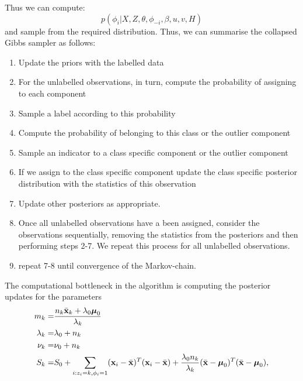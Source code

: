 \documentclass[12pt,english]{article}\usepackage[]{graphicx}\usepackage[]{color}
\begin{document}
Thus we can compute:
\begin{equation}
p(\phi_i|X,Z,\theta, \phi_{-i}, \beta, u,v, H)
\end{equation}
and sample from the required distribution. Thus, we can summarise the collapsed Gibbs sampler as follows:
\begin{enumerate}
\item Update the priors with the labelled data\\
\item For the unlabelled observations, in turn, compute the probability of assigning to each component\\
\item Sample a label according to this probability \\
\item Compute the probability of belonging to this class or the outlier component \\
\item Sample an indicator to a class specific component or the outlier component \\
\item If we assign to the class specific component update the class specific posterior distribution with the statistics of this observation \\
\item Update other posteriors as appropriate.
\item Once all unlabelled observations have a been assigned, consider the observations sequentially, removing the statistics from the posteriors and then performing steps 2-7. We repeat this process for all unlabelled observations.
\item repeat 7-8 until convergence of the Markov-chain.
\end{enumerate}
The computational bottleneck in the algorithm is computing the posterior updates for the parameters
\begin{equation}
\begin{split}
m_k = & \frac{n_k\bar{{\bf x}}_k + \lambda_0 \boldsymbol{\mu}_0}{\lambda_k}\\
\lambda_k = & \lambda_0 + n_k\\
\nu_k = & \nu_0 + n_k \\
S_k = & S_0 + \sum_{i:z_i = k, \phi_i = 1}({\bf x}_i - \bar{{\bf x}})^{T}({\bf x}_i - \bar{{\bf x}}) + \frac{\lambda_0n_k}{\lambda_k}(\bar{{\bf x}}- \boldsymbol{\mu}_0)^T(\bar{{\bf x}} - \boldsymbol{\mu}_0), \\
\end{split}
\end{equation}
\end{document}
